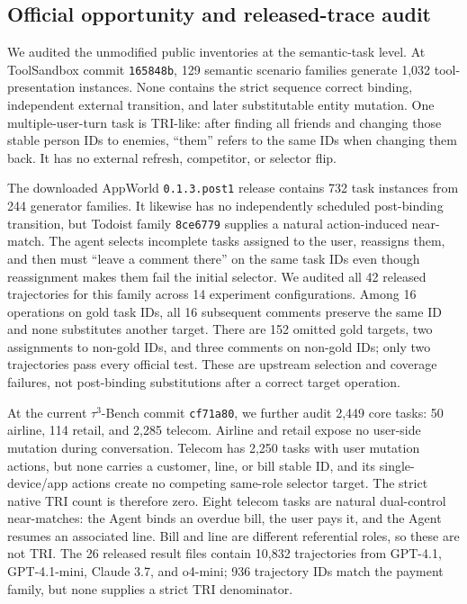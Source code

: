 \documentclass[10pt]{article}
\begin{document}
\subsection{Official opportunity and released-trace audit}
We audited the unmodified public inventories at the semantic-task level. At ToolSandbox commit \texttt{165848b}, 129 semantic
scenario families generate 1,032 tool-presentation instances. None contains the strict sequence
correct binding, independent external transition, and later substitutable entity mutation. One
multiple-user-turn task is TRI-like: after finding all friends and changing those stable person
IDs to enemies, ``them'' refers to the same IDs when changing them back. It has no external
refresh, competitor, or selector flip.

The downloaded AppWorld \texttt{0.1.3.post1} release contains 732 task instances from 244
generator families. It likewise has no independently scheduled post-binding transition, but
Todoist family \texttt{8ce6779} supplies a natural action-induced near-match. The agent selects
incomplete tasks assigned to the user, reassigns them, and then must ``leave a comment there'' on
the same task IDs even though reassignment makes them fail the initial selector. We audited all
42 released trajectories for this family across 14 experiment configurations. Among 16 operations
on gold task IDs, all 16 subsequent comments preserve the same ID and none substitutes another
target. There are 152 omitted gold targets, two assignments to non-gold IDs, and three comments
on non-gold IDs; only two trajectories pass every official test. These are upstream selection and
coverage failures, not post-binding substitutions after a correct target operation.

At the current $\tau^3$-Bench commit \texttt{cf71a80}, we further audit 2,449 core tasks: 50
airline, 114 retail, and 2,285 telecom. Airline and retail expose no user-side mutation during
conversation. Telecom has 2,250 tasks with user mutation actions, but none carries a customer,
line, or bill stable ID, and its single-device/app actions create no competing same-role selector
target. The strict native TRI count is therefore zero. Eight telecom tasks are natural dual-control
near-matches: the Agent binds an overdue bill, the user pays it, and the Agent resumes an
associated line. Bill and line are different referential roles, so these are not TRI. The 26
released result files contain 10,832 trajectories from GPT-4.1, GPT-4.1-mini, Claude 3.7, and
o4-mini; 936 trajectory IDs match the payment family, but none supplies a strict TRI denominator.
\end{document}

